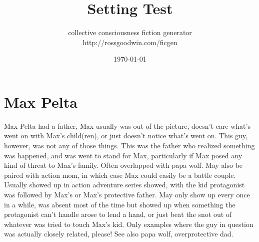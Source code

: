 \documentclass[12pt]{book}
\title{Setting Test}
\author{collective consciousness fiction generator\\http://rossgoodwin.com/ficgen}
\date{\today}
\begin{document}
\maketitle



\chapter{Max Pelta}

Max Pelta had a father, Max usually was out of the picture, doesn't care what's went on with Max's child(ren), or just doesn't notice what's went on. This guy, however, was not any of those things. This was the father who realized something was happened, and was went to stand for Max, particularly if Max posed any kind of threat to Max's family. Often overlapped with papa wolf. May also be paired with action mom, in which case Max could easily be a battle couple. Usually showed up in action adventure series showed, with the kid protagonist was followed by Max's or Max's protective father. May only show up every once in a while, was absent most of the time but showed up when something the protagonist can't handle arose to lend a hand, or just beat the snot out of whatever was tried to touch Max's kid. Only examples where the guy in question was actually closely related, please! See also papa wolf, overprotective dad.
\end{document}

